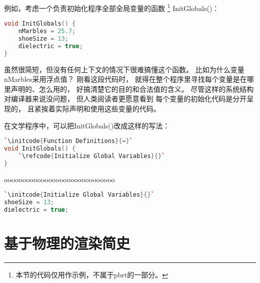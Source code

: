 例如，考虑一个负责初始化程序全部全局变量的函数
\footnote{本节的代码仅用作示例，不属于pbrt的一部分。}
{\ttfamily InitGlobals()}：
\begin{lstlisting}[language=C++]
void InitGlobals() {
    nMarbles = 25.7;
    shoeSize = 13;
    dielectric = true;
}
\end{lstlisting}
虽然很简短，但没有任何上下文的情况下很难搞懂这个函数。
比如为什么变量{\ttfamily nMarbles}采用浮点值？
刚看这段代码时，
就得在整个程序里寻找每个变量是在哪里声明的、怎么用的，
好搞清楚它的目的和合法值的含义。
尽管这样的系统结构对编译器来说没问题，
但人类阅读者更愿意看到
每个变量的初始化代码是分开呈现的，
且紧挨着实际声明和使用这些变量的代码。

在文学程序中，可以把{\ttfamily InitGlobals()}改成这样的写法：
\begin{lstlisting}[language=C++]
`\initcode{Function Definitions}{=}`
void InitGlobals() {
    `\refcode{Initialize Global Variables}{}`
}
\end{lstlisting}

oooooooooooooooooooooooooooooo

\begin{lstlisting}[language=C++]
`\initcode{Initialize Global Variables}{}`
shoeSize = 13;
dielectric = true;
\end{lstlisting}
\section{基于物理的渲染简史}\label{sec:基于物理的渲染简史}

